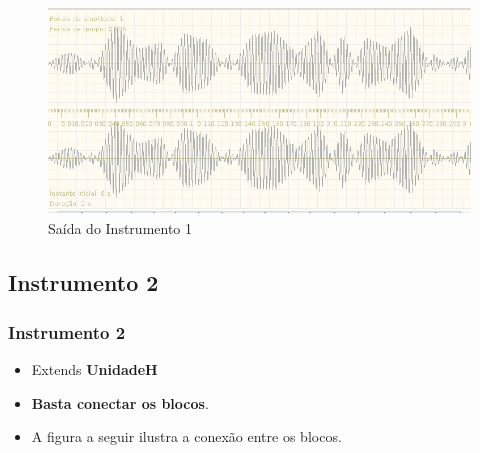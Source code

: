 \documentclass{beamer}
\begin{document}
\begin{frame}
 \begin{figure}
  \includegraphics[scale=0.4]{./images/ins1.png}
  \caption{Saída do Instrumento 1}
 \end{figure} 
\end{frame}
\subsection{Instrumento 2}
\begin{frame}
 \frametitle{Instrumento 2}
 \begin{itemize}
 \item Extends \textbf{UnidadeH}
 \item \textbf{Basta conectar os blocos}.
 \item A figura a seguir ilustra a conexão entre os blocos.
 \end{itemize}
\end{frame}
\end{document}
